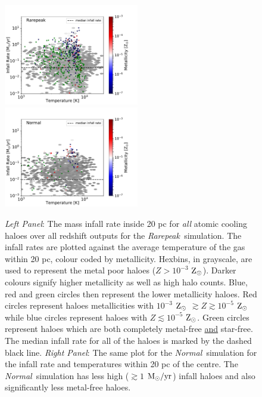 \documentclass[graphics, twocolumn, usenatbib]{mn2e}
\newcommand{\msolaryrc} {$\rm{M_{\odot}/yr}$}
\newcommand{\zsolar} {$\rm{Z_{\odot}}~$}
\newcommand{\zsolarc} {$\rm{Z_{\odot}}$}
\newcommand{\rarepeak} {\textit{Rarepeak~}}
\newcommand{\normal} {\textit{Normal~}}
\begin{document}
\begin{figure}
\centering
\begin{minipage}{175mm}      \begin{center} 
\centerline{
\includegraphics[width=0.525\textwidth]{FIGURES/Rarepeak_MdotTZ.pdf}
\includegraphics[width=0.525\textwidth]{FIGURES/Normal_MdotTZ.pdf}}
\caption{\textit{Left Panel}: The mass infall rate inside 20 pc for \textit{all} atomic
  cooling haloes over all redshift outputs for the \rarepeak simulation. The infall rates are plotted
  against the average temperature of the gas within 20 pc, colour coded by metallicity. Hexbins, in
  grayscale, are used to represent the metal poor haloes ($Z > 10^{-3}$ \zsolarc). Darker colours
  signify higher metallicity as well as high halo counts. Blue, red and green circles then
  represent the lower metallicity haloes. Red circles represent haloes metallicities
  with $10^{-3} $ \zsolar $\gtrsim Z \gtrsim 10^{-5}$ \zsolarc while blue circles represent
  haloes with $Z \lesssim 10^{-5}$ \zsolarc. Green circles represent haloes which are both
  completely metal-free \underline{and} star-free. The median infall rate for all of the haloes
  is marked by the dashed black line. \textit{Right Panel}: The same plot for the \normal simulation
  for the infall rate and temperatures within 20 pc of the centre.
  The \normal simulation has less high ($ \gtrsim 1 $ \msolaryrc) infall haloes and also
  significantly less metal-free haloes.} \label{Fig:Scatter}
\end{center} \end{minipage}

\end{figure}
\end{document}
